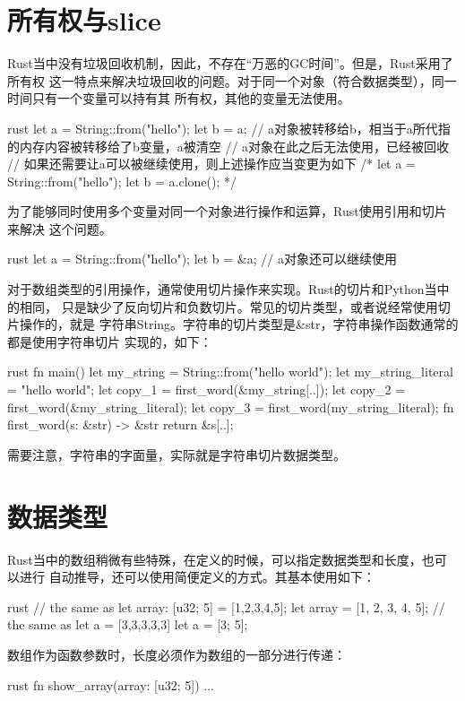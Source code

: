 \section{所有权与slice}
Rust当中没有垃圾回收机制，因此，不存在“万恶的GC时间”。但是，Rust采用了所有权
这一特点来解决垃圾回收的问题。对于同一个对象（符合数据类型），同一时间只有一个变量可以持有其
所有权，其他的变量无法使用。
\begin{code-block}{rust}
let a = String::from("hello");
let b = a; // a对象被转移给b，相当于a所代指的内存内容被转移给了b变量，a被清空
// a对象在此之后无法使用，已经被回收
// 如果还需要让a可以被继续使用，则上述操作应当变更为如下
/*
let a = String::from("hello");
let b = a.clone();
*/
\end{code-block}
为了能够同时使用多个变量对同一个对象进行操作和运算，Rust使用引用和切片来解决
这个问题。
\begin{code-block}{rust}
let a = String::from("hello");
let b = &a;
// a对象还可以继续使用
\end{code-block}

对于数组类型的引用操作，通常使用切片操作来实现。Rust的切片和Python当中的相同，
只是缺少了反向切片和负数切片。常见的切片类型，或者说经常使用切片操作的，就是
字符串String。字符串的切片类型是\&str，字符串操作函数通常的都是使用字符串切片
实现的，如下：
\begin{code-block}{rust}
fn main() {
    let my_string = String::from("hello world");
    let my_string_literal = "hello world";
    let copy_1 = first_word(&my_string[..]);
    let copy_2 = first_word(&my_string_literal);
    let copy_3 = first_word(my_string_literal);
}
fn first_word(s: &str) -> &str {
    return &s[..];
}
\end{code-block}
需要注意，字符串的字面量，实际就是字符串切片数据类型。

\section{数据类型}
Rust当中的数组稍微有些特殊，在定义的时候，可以指定数据类型和长度，也可以进行
自动推导，还可以使用简便定义的方式。其基本使用如下：
\begin{code-block}{rust}
// the same as let array: [u32; 5] = [1,2,3,4,5];
let array = [1, 2, 3, 4, 5];
// the same as let a = [3,3,3,3,3]
let a = [3; 5];
\end{code-block}

数组作为函数参数时，长度必须作为数组的一部分进行传递：
\begin{code-block}{rust}
fn show_array(array: [u32; 5]) {
    ...
}
\end{code-block}

